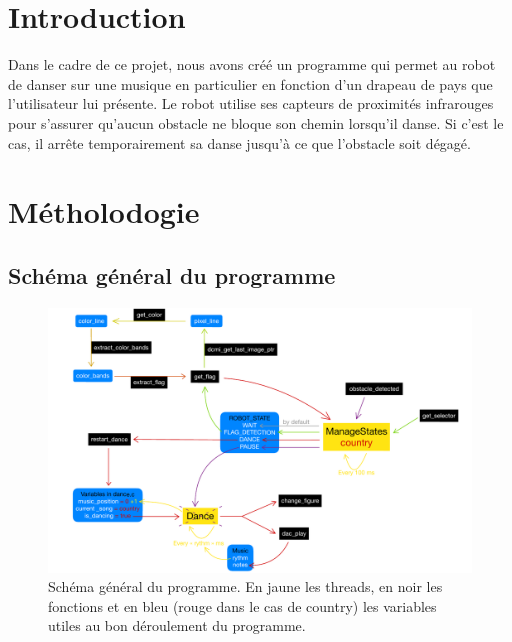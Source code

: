 \documentclass{article}
\begin{document}
    \thispagestyle{empty}

    \tableofcontents

    \newpage

    \setcounter{page}{1}

    \section{Introduction}

    Dans le cadre de ce projet, nous avons créé un programme qui permet au robot de danser sur une musique en particulier en fonction d'un drapeau de pays que l'utilisateur lui présente.
    Le robot utilise ses capteurs de proximités infrarouges pour s'assurer qu'aucun obstacle ne bloque son chemin lorsqu'il danse. 
    Si c'est le cas, il arrête temporairement sa danse jusqu'à ce que l'obstacle soit dégagé.

    \section{Métholodogie}
    
    \subsection{Schéma général du programme}
    \begin{figure}[!ht]
        \includegraphics[scale=0.75]{images/code-structure.pdf}
        \caption{Schéma général du programme. En jaune les threads, en noir les fonctions et en bleu (rouge dans le cas de country) les variables utiles au bon déroulement du programme.}
        \label{fig:structure} %
    \end{figure}
\end{document}
